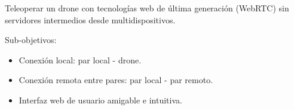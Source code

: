 \documentclass[notes,slidesec,a4]{seminar}
\begin{document}

\begin{hslide}
Teleoperar un drone con tecnologías web de última generación (WebRTC)
sin servidores intermedios desde multidispositivos.

Sub-objetivos:
\begin{itemize}
\item Conexión local: par local - drone.
\item Conexión remota entre pares: par local - par remoto.
\item Interfaz web de usuario amigable e intuitiva.
\end{itemize}
\end{hslide}

\end{document}
